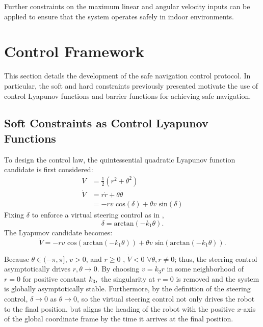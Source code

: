 \documentclass[journal]{IEEEtran}
\begin{document}
Further constraints on the maximum linear and angular velocity inputs can be applied to ensure that the system operates safely in indoor environments. 

\section{Control Framework}
This section details the development of the safe navigation control protocol. In particular, the soft and hard constraints previously presented motivate the use of control Lyapunov functions and barrier functions for achieving safe navigation.

\subsection{Soft Constraints as Control Lyapunov Functions}
To design the control law, the quintessential quadratic Lyapunov function candidate is first considered:
\begin{align}
V&=\frac{1}{2}(r^2+\theta^2)\\
\dot{V}&=r \dot{r}+\theta \dot{\theta}\\
&=-r v \text{ cos}(\delta) + \theta v \text{ sin}(\delta)
\end{align}
Fixing $\delta$ to enforce a virtual steering control as in \cite{park2011}, 
\begin{equation} 
\delta = \text{arctan}(-k_1\theta). \end{equation}
The Lyapunov candidate becomes:
\begin{equation}
\dot{V}=-r v \text{ cos}(\text{arctan}(-k_1\theta)) + \theta v \text{ sin}(\text{arctan}(-k_1\theta)).
\end{equation} 

Because $\theta\in (-\pi,\pi]$, $v>0$, and $r\geq 0$ , $\dot{V}<0$ $\forall \theta,r\neq0$; thus, the steering control asymptotically drives $r,\theta\to 0$. By choosing $v=k_3 r$ in some neighborhood of $r=0$ for positive constant $k_3,$ the singularity at $r=0$ is removed and the system is globally asymptotically stable. Furthermore, by the definition of the steering control, $\delta\to 0$ as $\theta \to 0$, so the virtual steering control not only drives the robot to the final position, but aligns the heading of the robot with the positive $x$-axis of the global coordinate frame by the time it arrives at the final position. 
\end{document}
